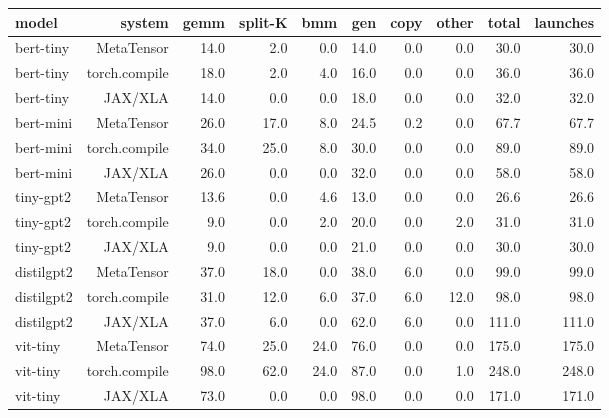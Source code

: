 \begin{tabular}{lrrrrrrrrr}
\toprule
model & system & gemm & split-K & bmm & gen & copy & other & total & launches \\
\midrule
bert-tiny & MetaTensor & 14.0 & 2.0 & 0.0 & 14.0 & 0.0 & 0.0 & 30.0 & 30.0 \\
bert-tiny & torch.compile & 18.0 & 2.0 & 4.0 & 16.0 & 0.0 & 0.0 & 36.0 & 36.0 \\
bert-tiny & JAX/XLA & 14.0 & 0.0 & 0.0 & 18.0 & 0.0 & 0.0 & 32.0 & 32.0 \\
bert-mini & MetaTensor & 26.0 & 17.0 & 8.0 & 24.5 & 0.2 & 0.0 & 67.7 & 67.7 \\
bert-mini & torch.compile & 34.0 & 25.0 & 8.0 & 30.0 & 0.0 & 0.0 & 89.0 & 89.0 \\
bert-mini & JAX/XLA & 26.0 & 0.0 & 0.0 & 32.0 & 0.0 & 0.0 & 58.0 & 58.0 \\
tiny-gpt2 & MetaTensor & 13.6 & 0.0 & 4.6 & 13.0 & 0.0 & 0.0 & 26.6 & 26.6 \\
tiny-gpt2 & torch.compile & 9.0 & 0.0 & 2.0 & 20.0 & 0.0 & 2.0 & 31.0 & 31.0 \\
tiny-gpt2 & JAX/XLA & 9.0 & 0.0 & 0.0 & 21.0 & 0.0 & 0.0 & 30.0 & 30.0 \\
distilgpt2 & MetaTensor & 37.0 & 18.0 & 0.0 & 38.0 & 6.0 & 0.0 & 99.0 & 99.0 \\
distilgpt2 & torch.compile & 31.0 & 12.0 & 6.0 & 37.0 & 6.0 & 12.0 & 98.0 & 98.0 \\
distilgpt2 & JAX/XLA & 37.0 & 6.0 & 0.0 & 62.0 & 6.0 & 0.0 & 111.0 & 111.0 \\
vit-tiny & MetaTensor & 74.0 & 25.0 & 24.0 & 76.0 & 0.0 & 0.0 & 175.0 & 175.0 \\
vit-tiny & torch.compile & 98.0 & 62.0 & 24.0 & 87.0 & 0.0 & 1.0 & 248.0 & 248.0 \\
vit-tiny & JAX/XLA & 73.0 & 0.0 & 0.0 & 98.0 & 0.0 & 0.0 & 171.0 & 171.0 \\
\bottomrule
\end{tabular}
